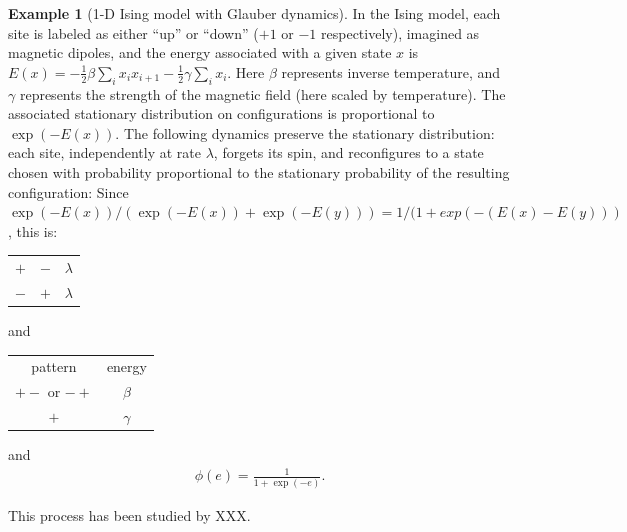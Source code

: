 \documentclass{article}
\theoremstyle{plain}
\theoremstyle{definition}
\newtheorem{example}{Example}[section]
\begin{document}
\begin{example}[1-D Ising model with Glauber dynamics]
    In the Ising model, each site is labeled as either ``up'' or ``down'' ($+1$ or $-1$ respectively),
    imagined as magnetic dipoles,
    and the energy associated with a given state $x$ is $E(x) = - \frac{1}{2} \beta \sum_i x_i x_{i+1} - \frac{1}{2} \gamma \sum_i x_i$.
    Here $\beta$ represents inverse temperature, and $\gamma$ represents the strength of the magnetic field (here scaled by temperature).
    The associated stationary distribution on configurations is proportional to $\exp(-E(x))$.
    The following dynamics preserve the stationary distribution:
    each site, independently at rate $\lambda$,
    forgets its spin,
    and reconfigures to a state chosen with probability proportional to the stationary probability of the resulting configuration:
    Since $\exp(-E(x))/(\exp(-E(x))+\exp(-E(y))) = 1/(1+exp(-(E(x)-E(y)))$,
    this is:
    \begin{center}
        \begin{tabular}{c@{\quad$\to$\quad}c@{\quad at rate\quad }c}
          $+$  &   $-$   &  $\lambda$ \\
          $-$  &   $+$   &  $\lambda$ 
        \end{tabular} 
        \qquad and \qquad
        \begin{tabular}{cc}
        pattern  &  energy \\
        $+-$ or $-+$  &   $\beta$ \\
        $+$ &   $\gamma$
        \end{tabular} 
    \end{center}
    and 
    \begin{align*}
        \phi(e) = \frac{1}{1+\exp(-e)} .
    \end{align*}

    This process has been studied by XXX.
\end{example}
\end{document}

